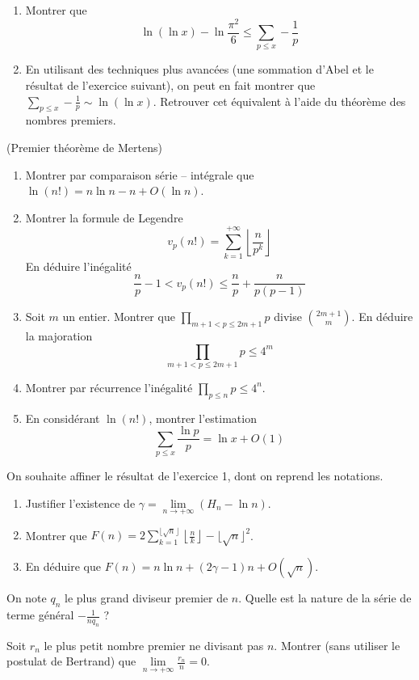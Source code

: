 \begin{exo}
\begin{enumerate}
\item Montrer que
$$\ln(\ln x) - \ln \frac{\pi^2}{6} \le \sum_{p \le x} - \frac 1p$$
\item En utilisant des techniques plus avancées (une sommation d'Abel et le résultat de l'exercice suivant), on peut en fait montrer que $\sum_{p \le x} - \frac 1p \sim \ln(\ln x)$. Retrouver cet équivalent à l'aide du théorème des nombres premiers.
\end{enumerate}
\end{exo}

\begin{exo}(Premier théorème de Mertens)
\begin{enumerate}
\item Montrer par comparaison série -- intégrale que $\ln(n!) = n \ln n - n + O(\ln n)$.
\item Montrer la formule de Legendre
$$v_p(n!) = \sum_{k = 1}^{+\infty} \left\lfloor \frac{n}{p^k} \right\rfloor$$
En déduire l'inégalité
$$\frac{n}{p} - 1 < v_p(n!) \le \frac{n}{p} + \frac n{p(p - 1)}$$
\item Soit $m$ un entier. Montrer que $\displaystyle\prod_{m+1<p\le 2m+1} p$ divise $\binom{2m+1}{m}$. En déduire la majoration
$$\displaystyle\prod_{m+1<p\le 2m+1} p \le 4^m$$
\item Montrer par récurrence l'inégalité $\displaystyle\prod_{p\le n} p \le 4^n$.
\item En considérant $\ln(n!)$, montrer l'estimation
$$\sum_{p \le x} \frac{\ln p}{p} = \ln x + O(1)$$
\end{enumerate}
\end{exo}


\begin{exo}
On souhaite affiner le résultat de l'exercice 1, dont on reprend les notations.
\begin{enumerate}
	\item Justifier l'existence de $\gamma = \lim\limits_{n \rightarrow +\infty} \left(H_n - \ln n \right)$.
	\item Montrer que $F(n) = 2 \displaystyle\sum_{k = 1}^{\lfloor \sqrt{n} \rfloor} \left\lfloor \frac{n}{k} \right\rfloor - \lfloor \sqrt{n} \rfloor^2$.
	\item En déduire que $F(n) = n \ln n + (2\gamma - 1)n + O(\sqrt{n})$.
\end{enumerate}
\end{exo}


\begin{exo}
On note $q_n$ le plus grand diviseur premier de $n$.\newline
Quelle est la nature de la série de terme général $- \frac 1{nq_n}$ ?
\end{exo}


\begin{exo}
Soit $r_n$ le plus petit nombre premier ne divisant pas $n$.\newline
Montrer (sans utiliser le postulat de Bertrand) que $\lim\limits_{n \rightarrow +\infty} \frac{r_n}{n} = 0$.
\end{exo}